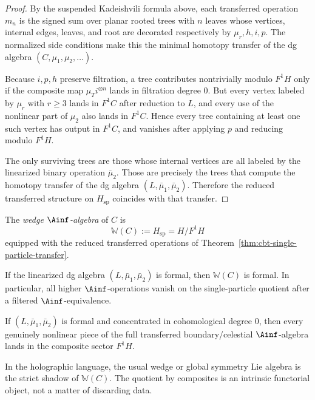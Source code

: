 \begin{proof}
By the suspended Kadeishvili formula above, each transferred operation
\(m_n\) is the signed sum over planar rooted trees with \(n\) leaves
whose vertices, internal edges, leaves, and root are decorated
respectively by \(\mu_r,h,i,p\). The normalized side conditions make
this the minimal homotopy transfer of the dg algebra
\((C,\mu_1,\mu_2,\ldots)\).

Because $i,p,h$ preserve filtration, a tree contributes nontrivially modulo $F^1H$ only if the composite map $\mu_T i^{\otimes n}$ lands in filtration degree $0$. But every vertex labeled by $\mu_r$ with $r\ge 3$ lands in $F^1C$ after reduction to $L$, and every use of the nonlinear part of $\mu_2$ also lands in $F^1C$. Hence every tree containing at least one such vertex has output in $F^1C$, and vanishes after applying $p$ and reducing modulo $F^1H$.

The only surviving trees are those whose internal vertices are all labeled by the linearized binary operation $\bar\mu_2$. Those are precisely the trees that compute the homotopy transfer of the dg algebra $(L,\bar\mu_1,\bar\mu_2)$. Therefore the reduced transferred structure on $H_{\mathrm{sp}}$ coincides with that transfer.
\end{proof}

\begin{definition}
The \emph{wedge $\Ainf$-algebra} of $C$ is
\[
\mathbb{W}(C):=H_{\mathrm{sp}}=H/F^1H
\]
equipped with the reduced transferred operations of Theorem~\ref{thm:cbt-single-particle-transfer}.
\end{definition}

\begin{corollary}
If the linearized dg algebra $(L,\bar\mu_1,\bar\mu_2)$ is formal, then $\mathbb{W}(C)$ is formal. In particular, all higher $\Ainf$-operations vanish on the single-particle quotient after a filtered $\Ainf$-equivalence.
\end{corollary}

\begin{corollary}
If $(L,\bar\mu_1,\bar\mu_2)$ is formal and concentrated in cohomological degree $0$, then every genuinely nonlinear piece of the full transferred boundary/celestial $\Ainf$-algebra lands in the composite sector $F^1H$.
\end{corollary}

\begin{remark}
In the holographic language, the usual wedge or global symmetry Lie algebra is the strict shadow of $\mathbb{W}(C)$. The quotient by composites is an intrinsic functorial object, not a matter of discarding data.
\end{remark}

